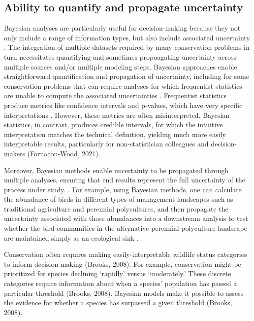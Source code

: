 \documentclass{article}
\begin{document}
\subsection*{Ability to quantify and propagate uncertainty} 
\par Bayesian analyses are particularly useful for decision-making because they not only include a range of information types, but also include associated uncertainty \citep{stern2022interweaving}. The integration of multiple datasets required by many conservation problems in turn necessitates quantifying and sometimes propoagating uncertainty across multiple sources and/or multiple modeling steps. Bayesian approaches enable straightforward quantification and  propagation of  uncertainty, including for some conservation problems that can require analyses for which frequentist statistics are unable to compute the associated uncertainties \citep{bolker2009a,bates2006r}. Frequentist statistics produce metrics like confidence intervals and p-values, which have very specific interpretations \citep{fornacon2021bayesian}. However, these metrics are often misinterpreted. Bayesian statistics, in contrast, produces credible intervals, for which the intuitive interpretation matches the technical definition, yielding much more easily interpretable results, particularly for non-statistician colleagues and decision-makers (Fornacon-Wood, 2021). 
\par Moreover, Bayesian methods enable uncertainty to be propagated through multiple analyses, ensuring that end results represent the full uncertainty of the process under study. \citep{draper1995assessment,gilbert2023propagating,Eyster2022,Saunders2019}. For example, using Bayesian methods, one can calculate the abundance of birds in different types of management landscapes such as traditional agriculture and perennial polycultures, and then propagate the uncertainty associated with those abundances into a downstream analysis to test whether the bird communities in the alternative perennial polyculture landscape are maintained simply as an ecological sink \citep{Eyster2022}. 


\par Conservation often requires making easily-interpretable wildlife status categories to inform decision making (Brooks, 2008). For example, conservation might be prioritized for species declining `rapidly' versus `moderately.' These discrete categories require information about when a species' population has passed a particular threshold (Brooks, 2008).  Bayesian models make it possible to assess the evidence for whether a species has surpassed a given threshold (Brooks, 2008). 
\end{document}
